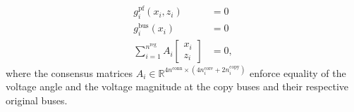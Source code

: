\documentclass{article}
\newcommand{\n}{n}
\newcommand{\nregions}{\n^{\text{reg}}}
\newcommand{\nconnections}{\n^{\text{conn}}}
\newcommand{\ncore}{\n^\text{core}}
\newcommand{\ncopy}{\n^\text{copy}}
\newcommand{\stateCore}{x}
\newcommand{\stateCopy}{z}
\newcommand{\pf}{g^{\text{pf}}}
\newcommand{\busspecs}{g^{\text{bus}}}
\begin{document}
\begin{subequations}
    \begin{align}
        \pf_i( \stateCore_i, \stateCopy_i ) &= 0 \\
        \busspecs_i ( \stateCore_i ) &= 0 \\
        \sum_{i = 1}^{\nregions} A_i \begin{bmatrix}
            \stateCore_i \\
            \stateCopy_i
        \end{bmatrix}
        &= 0,
    \end{align}
\end{subequations}
where the consensus matrices $A_i \in \mathbb{R}^{4 \nconnections \times (4 \ncore_i + 2 \ncopy_i)}$ enforce equality of the voltage angle and the voltage magnitude at the copy buses and their respective original buses.
\end{document}
